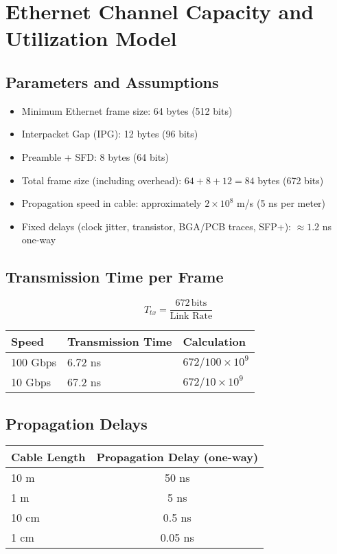 \documentclass[../HFT-main.tex]{subfiles} %
\begin{document}
\section*{Ethernet Channel Capacity and Utilization Model}

\subsection*{Parameters and Assumptions}

\begin{itemize}
    \item Minimum Ethernet frame size: 64 bytes (512 bits)
    \item Interpacket Gap (IPG): 12 bytes (96 bits)
    \item Preamble + SFD: 8 bytes (64 bits)
    \item Total frame size (including overhead): $64 + 8 + 12 = 84$ bytes (672 bits)
    \item Propagation speed in cable: approximately $2 \times 10^{8}$ m/s (5 ns per meter)
    \item Fixed delays (clock jitter, transistor, BGA/PCB traces, SFP+): $\approx 1.2$ ns one-way
\end{itemize}

\subsection*{Transmission Time per Frame}
\[
T_{tx} = \frac{672\,\text{bits}}{\text{Link Rate}}
\]
\begin{tabular}{@{}lll@{}}
\toprule
Speed & Transmission Time & Calculation\\
\midrule
100 Gbps & 6.72 ns & $672/100\times10^{9}$ \\
10 Gbps & 67.2 ns & $672/10\times10^{9}$ \\
\bottomrule
\end{tabular}

\subsection*{Propagation Delays}
\begin{tabular}{@{}lc@{}}
\toprule
Cable Length & Propagation Delay (one-way) \\
\midrule
10 m & 50 ns \\
1 m & 5 ns \\
10 cm & 0.5 ns \\
1 cm & 0.05 ns \\
\bottomrule
\end{tabular}
\end{document}
